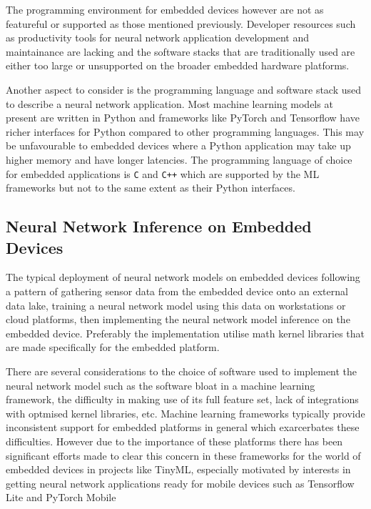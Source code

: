 
The programming environment for embedded devices however are not as featureful or supported as those mentioned previously. Developer resources such as productivity tools for neural network application development and maintainance are lacking and the software stacks that are traditionally used are either too large or unsupported on the broader embedded hardware platforms.

Another aspect to consider is the programming language and software stack used to describe a neural network application. Most machine learning models at present are written in Python and frameworks like PyTorch and Tensorflow have richer interfaces for Python compared to other programming languages. This may be unfavourable to embedded devices where a Python application may take up higher memory and have longer latencies. The programming language of choice for embedded applications is \texttt{C} and \texttt{C++} which are supported by the ML frameworks but not to the same extent as their Python interfaces.


\subsection{Neural Network Inference on Embedded Devices}

The typical deployment of neural network models on embedded devices following a pattern of gathering sensor data from the embedded device onto an external data lake, training a neural network model using this data on workstations or cloud platforms, then implementing the neural network model inference on the embedded device. Preferably the implementation utilise math kernel libraries that are made specifically for the embedded platform.

There are several considerations to the choice of software used to implement the neural network model such as the software bloat in a machine learning framework, the difficulty in making use of its full feature set, lack of integrations with optmised kernel libraries, etc. Machine learning frameworks typically provide inconsistent support for embedded platforms in general which exarcerbates these difficulties. However due to the importance of these platforms there has been significant efforts made to clear this concern in these frameworks for the world of embedded devices in projects like TinyML\cite{tinyml}, especially motivated by interests in getting neural network applications ready for mobile devices such as Tensorflow Lite\cite{tfl} and PyTorch Mobile \cite{pytorch-mobile}


